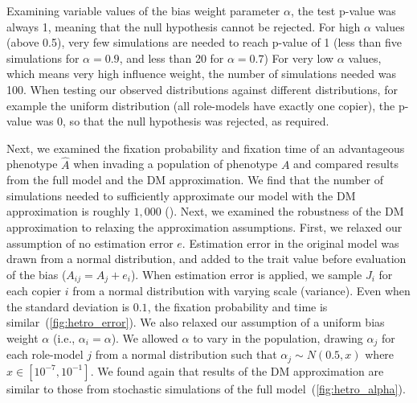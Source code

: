 \documentclass[12pt]{extarticle}
\begin{document}
Examining variable values of the bias weight parameter $\alpha$, the test p-value was always 1, meaning that the null hypothesis cannot be rejected.
For high $\alpha$ values (above 0.5), very few simulations are needed to reach p-value of 1 (less than five simulations for $\alpha=0.9$, and less than 20 for $\alpha=0.7$)
For very low $\alpha$ values, which means very high influence weight, the number of simulations needed was 100.
When testing our observed distributions against different distributions, for example the uniform distribution (all role-models have exactly one copier), the p-value was 0, so that the null hypothesis was rejected, as required.


Next, we examined the fixation probability and fixation time of an advantageous phenotype $\hat{A}$ when invading a population of phenotype $A$ and compared results from the full model and the DM approximation.
We find that the number of simulations needed to sufficiently approximate our model with the DM approximation is roughly $1,000$ ().
Next, we examined the robustness of the DM approximation to relaxing the approximation assumptions.
First, we relaxed our assumption of no estimation error $e$.
Estimation error in the original model was drawn from a normal distribution, and added to the trait value before evaluation of the bias ($A_{ij} = A_j + e_i$).
When estimation error is applied, we sample $J_i$ for each copier $i$ from a normal distribution with varying scale (variance).
Even when the standard deviation is $0.1$, the fixation probability and time is similar~(\cref{fig:hetro_error}). 
We also relaxed our assumption of a uniform bias weight $\alpha$ (i.e., $\alpha_i=\alpha$). We allowed $\alpha$ to vary in the population, drawing $\alpha_j$ for each role-model $j$ from a normal distribution such that $\alpha_j \sim N(0.5,x)$ where $x \in [10^{-7},10^{-1}]$. 
We found again that results of the DM approximation are similar to those from stochastic simulations of the full model~(\cref{fig:hetro_alpha}).
\end{document}
